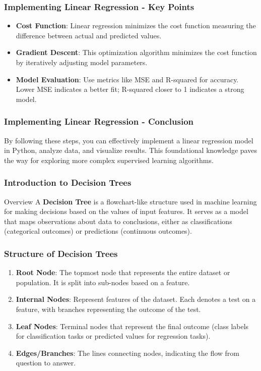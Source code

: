 \documentclass{beamer}
\begin{document}
\begin{frame}
    \frametitle{Implementing Linear Regression - Key Points}
    \begin{itemize}
        \item \textbf{Cost Function}: Linear regression minimizes the cost function measuring the difference between actual and predicted values.
        \item \textbf{Gradient Descent}: This optimization algorithm minimizes the cost function by iteratively adjusting model parameters.
        \item \textbf{Model Evaluation}: Use metrics like MSE and R-squared for accuracy. Lower MSE indicates a better fit; R-squared closer to 1 indicates a strong model.
    \end{itemize}
\end{frame}

\begin{frame}
    \frametitle{Implementing Linear Regression - Conclusion}
    By following these steps, you can effectively implement a linear regression model in Python, analyze data, and visualize results. This foundational knowledge paves the way for exploring more complex supervised learning algorithms.
\end{frame}

\begin{frame}[fragile]
    \frametitle{Introduction to Decision Trees}
    
    \begin{block}{Overview}
        A \textbf{Decision Tree} is a flowchart-like structure used in machine learning for making decisions based on the values of input features. It serves as a model that maps observations about data to conclusions, either as classifications (categorical outcomes) or predictions (continuous outcomes).
    \end{block}
\end{frame}

\begin{frame}[fragile]
    \frametitle{Structure of Decision Trees}
    
    \begin{enumerate}
        \item \textbf{Root Node}: The topmost node that represents the entire dataset or population. It is split into sub-nodes based on a feature.
        
        \item \textbf{Internal Nodes}: Represent features of the dataset. Each denotes a test on a feature, with branches representing the outcome of the test.
        
        \item \textbf{Leaf Nodes}: Terminal nodes that represent the final outcome (class labels for classification tasks or predicted values for regression tasks).
        
        \item \textbf{Edges/Branches}: The lines connecting nodes, indicating the flow from question to answer.
    \end{enumerate}
\end{frame}
\end{document}
